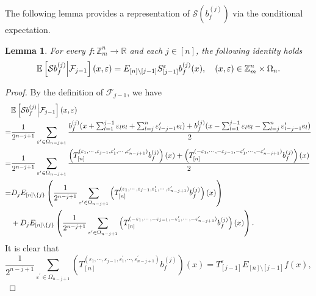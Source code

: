 \documentclass{amsart}
\numberwithin{equation}{section}
\newtheorem{lem}[thm]{Lemma}
\newcommand{\Z}{{\mathbb{Z}^{n}_{m}}}
\begin{document}
The following lemma provides a representation of $\mathcal{S}(b^{(j)}_{f})$ via the conditional expectation.
\begin{lem}\label{representation 1}
For every $f:\Z\to \mathbb{R}$ and  each $j\in [n]$, the following identity holds
\[
\begin{split}
\mathbb{E}\left[\mathcal{S}b^{(j)}_{f}\Big{|}\mathcal{F}_{j-1}\right](x,\varepsilon)=E_{[n]\setminus[j-1]}S^{\varepsilon}_{[j-1]}b^{(j)}_{f}(x),\quad (x,\varepsilon)\in \Z\times \Omega_{n}.
\end{split}
\]
\end{lem}
\begin{proof}
By the definition of $\mathcal{F}_{j-1}$, we have 
\begin{equation}\label{expansion 1}
\begin{split}
&\mathbb{E}\left[\mathcal{S}b^{(j)}_{f}\Big{|}\mathcal{F}_{j-1}\right](x,\varepsilon)\\
=&\frac{1}{2^{n-j+1}}\sum_{\varepsilon^{\prime}\in \Omega_{n-j+1}}\frac{b^{(j)}_{f}(x+\sum_{l=1}^{j-1}\varepsilon_{l}e_{l}+\sum_{l=j}^{n}\varepsilon^{\prime}_{l-j-1}e_{l})+b^{(j)}_{f}(x-\sum_{l=1}^{j-1}\varepsilon_{l}e_{l}-\sum_{l=j}^{n}\varepsilon^{\prime}_{l-j-1}e_{l})}{2}\\
=&\frac{1}{2^{n-j+1}}\sum_{\varepsilon^{\prime}\in \Omega_{n-j+1}}\frac{\left(T^{(\varepsilon_{1},\cdots, \varepsilon_{j-1},\varepsilon^{\prime}_{1},\cdots, \varepsilon^{\prime}_{n-j+1})}_{[n]}b^{(j)}_{f}\right)(x)+\left(T^{(-\varepsilon_{1},\cdots, -\varepsilon_{j-1},-\varepsilon^{\prime}_{1},\cdots, -\varepsilon^{\prime}_{n-j+1})}_{[n]}b^{(j)}_{f}\right)(x)}{2}\\
=&D_{j}E_{[n]\setminus\{j\}}\left(\frac{1}{2^{n-j+1}}\sum_{\varepsilon^{\prime}\in \Omega_{n-j+1}}\left(T^{(\varepsilon_{1},\cdots, \varepsilon_{j-1},\varepsilon^{\prime}_{1},\cdots, \varepsilon^{\prime}_{n-j+1})}_{[n]}b^{(j)}_{f}\right)(x)\right)\\
&+D_{j}E_{[n]\setminus\{j\}}\left(\frac{1}{2^{n-j+1}}\sum_{\varepsilon^{\prime}\in \Omega_{n-j+1}}\left(T^{(-\varepsilon_{1},\cdots, -\varepsilon_{j-1},-\varepsilon^{\prime}_{1},\cdots, -\varepsilon^{\prime}_{n-j+1})}_{[n]}b^{(j)}_{f}\right)(x)\right).
\end{split}
\end{equation}
It is clear that
\begin{equation}\label{expansion 2}
\frac{1}{2^{n-j+1}}\sum_{\varepsilon^{\prime}\in \Omega_{n-j+1}}\left(T^{(\varepsilon_{1},\cdots, \varepsilon_{j-1},\varepsilon^{\prime}_{1},\cdots, \varepsilon^{\prime}_{n-j+1})}_{[n]}b^{(j)}_{f}\right)(x)=T^{\varepsilon}_{[j-1]}E_{[n]\setminus[j-1]}f(x),

\end{equation}
\end{proof}
\end{document}

